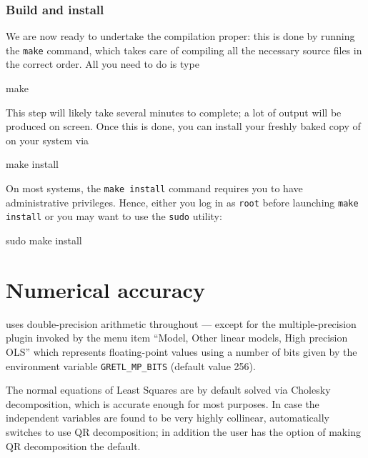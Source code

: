 

\subsection{Build and install}

We are now ready to undertake the compilation proper: this is done by
running the \texttt{make} command, which takes care of compiling all
the necessary source files in the correct order. All you need to do is
type
\begin{code}
make 
\end{code}

This step will likely take several minutes to complete; a lot of
output will be produced on screen. Once this is done, you can install
your freshly baked copy of  on your system via
\begin{code}
make install
\end{code}

On most systems, the \texttt{make install} command requires you to
have administrative privileges.  Hence, either you log in as
\texttt{root} before launching \texttt{make install} or you may want
to use the \texttt{sudo} utility:
\begin{code}
sudo make install
\end{code}


\chapter{Numerical accuracy}
\label{app-accuracy}

 uses double-precision arithmetic throughout --- except for
the multiple-precision plugin invoked by the menu item ``Model, Other
linear models, High precision OLS'' which represents floating-point
values using a number of bits given by the environment variable
\verb+GRETL_MP_BITS+ (default value 256).  

The normal equations of Least Squares are by default solved via
Cholesky decomposition, which is accurate enough for most purposes.
In case the independent variables are found to be very highly
collinear,  automatically switches to use QR decomposition;
in addition the user has the option of making QR decomposition the
default.  

